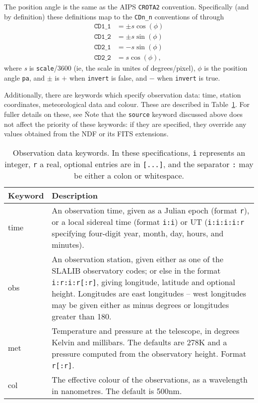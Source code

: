 \documentclass[twoside,11pt,nolof]{starlink}
\providecommand{\ASTROMref}{\xref{{\footnotesize ASTROM}}{sun5}{}}
\begin{document}
The position angle is the same as the AIPS \texttt{CROTA2}
convention. Specifically (and by definition) these definitions map to the
\texttt{CDn\_n} conventions of \cite{fitswcs2} through
\begin{align*}
\texttt{CD1\_1} & = \pm s \cos( \phi ) \\
\texttt{CD1\_2} & = \pm s \sin( \phi ) \\
\texttt{CD2\_1} & = - s \sin( \phi ) \\
\texttt{CD2\_2} & = s \cos( \phi ),
\end{align*}
where \textit{s} is \texttt{scale}/3600 (ie, the scale in unites of
degrees/pixel), $\phi$ is the position angle \texttt{pa}, and $\pm$ is $+$
when \texttt{invert} is false, and $-$ when \texttt{invert} is true.

Additionally, there are keywords which specify observation data: time, station
coordinates, meteorological data and colour.  These are described in
Table~\ref{tab:datetime}.  For fuller details on these, see \ASTROMref\.  Note
that the \texttt{source} keyword discussed above does not affect the priority
of these keywords: if they are specified, they override any values obtained
from the NDF or its FITS extensions.

\begin{table}
\begin{center}
\begin{tabular}{l|p{10cm}}
Keyword & Description \\ \hline
time & An observation time, given as a Julian epoch (format \texttt{r}), or a
local sidereal time (format \texttt{i:i}) or UT (\texttt{i:i:i:i:r} specifying
four-digit year, month, day, hours, and minutes). \\
obs & An observation station, given either as one of the SLALIB observatory
codes; or else in the format \texttt{i:r:i:r[:r]}, giving longitude, latitude
and optional height. Longitudes are east longitudes -- west longitudes may be
given either as minus degrees or longitudes greater than 180. \\
met & Temperature and pressure at the telescope, in degrees Kelvin and
millibars. The defaults are 278K and a pressure computed from the observatory
height. Format \texttt{r[:r]}. \\
col & The effective colour of the observations, as a wavelength in
nanometres. The default is 500nm.
\end{tabular}
\end{center}
\caption{\label{tab:datetime}Observation data keywords. In these
  specifications, \texttt{i} represents an integer, \texttt{r} a real,
  optional entries are in \texttt{[...]}, and the separator \texttt{:} may be
  either a colon or whitespace.}
\end{table}
\end{document}
